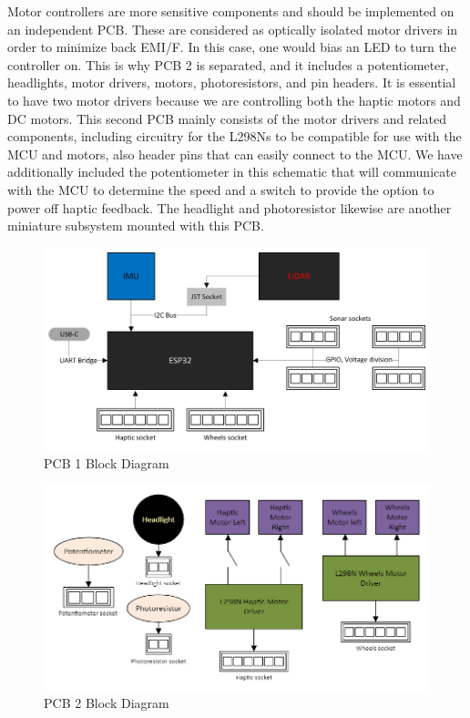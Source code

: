\noindent Motor controllers are more sensitive components and should be implemented on an independent PCB. These are considered as optically isolated motor drivers in order to minimize back EMI/F. In this case, one would bias an LED to turn the controller on. This is why PCB 2 is separated, and it includes a potentiometer, headlights, motor drivers, motors, photoresistors, and pin headers. It is essential to have two motor drivers because we are controlling both the haptic motors and DC motors. This second PCB mainly consists of the motor drivers and related components, including circuitry for the L298Ns to be compatible for use with the MCU and motors, also header pins that can easily connect to the MCU. We have additionally included the potentiometer in this schematic that will communicate with the MCU to determine the speed and a switch to provide the option to power off haptic feedback. The headlight and photoresistor likewise are another miniature subsystem mounted with this PCB. \\

\begin{figure}[H]
	\centering
	\includegraphics[width=\textwidth]{./Images/PCB1-Block-Diagram.png}
	\caption{\label{fig:pcb}PCB 1 Block Diagram}
\end{figure}

\begin{figure}[H]
	\centering
	\includegraphics[width=\textwidth]{./Images/pcb2-block2.png}
	\caption{\label{fig:pcb2}PCB 2 Block Diagram}
\end{figure}

